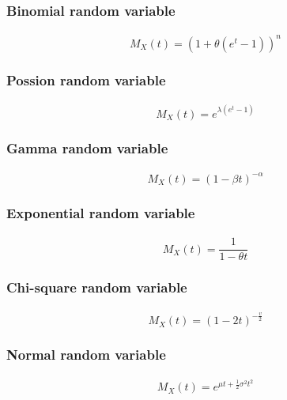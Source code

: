 \documentclass[titlepage]{article}
\begin{document}
        \subsubsection{Binomial random variable}
            \paragraph{
                $$M_X(t)=(1+\theta(e^t-1))^n$$
            }
        \subsubsection{Possion random variable}
            \paragraph{
                $$M_X(t)=e^{\lambda(e^t-1)}$$
            }
        \subsubsection{Gamma random variable}
            \paragraph{
                $$M_X(t)=(1-\beta t)^{-\alpha}$$
            }
        \subsubsection{Exponential random variable}
            \paragraph{
                $$M_X(t)=\frac{1}{1-\theta t}$$
            }
        \subsubsection{Chi-square random variable}
            \paragraph{
                $$M_X(t)=(1-2t)^{-\frac{v}{2}}$$
            }
        \subsubsection{Normal random variable}
            \paragraph{
                $$M_X(t)=e^{\mu t+\frac{1}{2}\sigma^2 t^2}$$
            }
\end{document}
